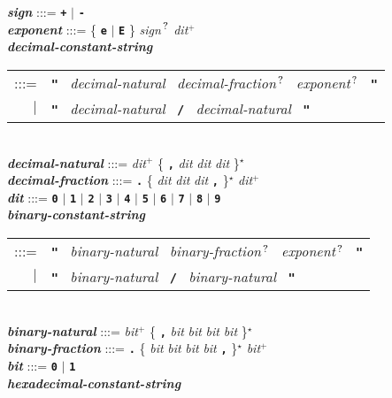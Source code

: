 \documentclass[12pt]{article}
\newcommand{\TT}[1]{{\tt \bfseries #1}}
\newcommand{\STAR}{{\Large $^\star$}}
\newcommand{\PLUS}[1][]{{$^{+#1}$}}
\newcommand{\QMARK}{{$^{\,\mbox{\footnotesize ?}}$}}
\newcommand{\emkey}[1]{{\em \bfseries #1}}
\newenvironment{indpar}[1][0.3in]%
	{\begin{list}{}%
		     {\setlength{\itemsep}{0in}%
		      \setlength{\topsep}{0in}%
		      \setlength{\parsep}{1ex}%
		      \setlength{\labelwidth}{#1}%
		      \setlength{\leftmargin}{#1}%
		      \addtolength{\leftmargin}{\labelsep}}%
	 \item}%
	{\end{list}}
\begin{document}
\begin{indpar}
\emkey{sign} :::= \TT{+} $|$ \TT{-} \\
\emkey{exponent} :::=
	\{ \TT{e} $|$ \TT{E} \} {\em sign}\QMARK{} {\em dit}\PLUS{}
\\[0.5ex]
\emkey{decimal-constant-string} \\
\hspace*{0.5in}
    \begin{tabular}[t]{@{}rl}
    :::= & \TT{"}~ {\em decimal-natural}~ {\em decimal-fraction}\QMARK{}~
    				          {\em exponent}\QMARK{}~ \TT{"} \\
     $|$ & \TT{"}~ {\em decimal-natural}~ \TT{/}~
                   {\em decimal-natural}~ \TT{"} \\
    \end{tabular}
\\[0.5ex]
\emkey{decimal-natural}
    :::= {\em dit}\PLUS{}
         \{ \TT{,} {\em dit} {\em dit} {\em dit} \}\STAR{} \\
\emkey{decimal-fraction} :::=
    \TT{.} \{ {\em dit} {\em dit} {\em dit} \TT{,} \}\STAR{}
           {\em dit}\PLUS{} \\
\emkey{dit}\label{DIT}
	:::= \TT{0} $|$ \TT{1} $|$ \TT{2} $|$ \TT{3} $|$ \TT{4}
                    $|$ \TT{5} $|$ \TT{6} $|$ \TT{7} $|$ \TT{8} $|$ \TT{9}
\\[0.5ex]
\emkey{binary-constant-string} \\
\hspace*{0.5in}
    \begin{tabular}[t]{@{}rl}
    :::= & \TT{"}~ {\em binary-natural}~ {\em binary-fraction}\QMARK{}~
    				          {\em exponent}\QMARK{}~ \TT{"} \\
     $|$ & \TT{"}~ {\em binary-natural}~ \TT{/}~
                   {\em binary-natural}~ \TT{"} \\
    \end{tabular}
\\[0.5ex]
\emkey{binary-natural}
    :::= {\em bit}\PLUS{}
           \{ \TT{,} {\em bit} {\em bit} {\em bit} {\em bit} \}\STAR{} \\
\emkey{binary-fraction} :::=
    \TT{.} \{ {\em bit} {\em bit} {\em bit} {\em bit} \TT{,} \}\STAR{}
    {\em bit}\PLUS{} \\
\emkey{bit} :::= \TT{0} $|$ \TT{1}
\\[0.5ex]
\emkey{hexadecimal-constant-string} \\
\hspace*{0.5in}
    \begin{tabular}[t]{@{}rl}

\end{tabular}
\end{indpar}
\end{document}
